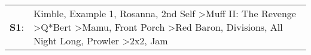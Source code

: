 \begin{supertabular}{p{0.03\textwidth}p{0.92\textwidth}}
 \textbf{S1}:  &  Kimble\textsuperscript{}, \enspace Example 1\textsuperscript{}, \enspace Rosanna\textsuperscript{}, \enspace 2nd Self\textsuperscript{} \textgreater \enspace Muff II: The Revenge\textsuperscript{} \textgreater \enspace Q*Bert\textsuperscript{} \textgreater \enspace Mamu\textsuperscript{}, \enspace Front Porch\textsuperscript{} \textgreater \enspace Red Baron\textsuperscript{}, \enspace Divisions\textsuperscript{}, \enspace All Night Long\textsuperscript{}, \enspace Prowler\textsuperscript{} \textgreater \enspace 2x2\textsuperscript{}, \enspace Jam\textsuperscript{}  \enspace  \\
\end{supertabular}
